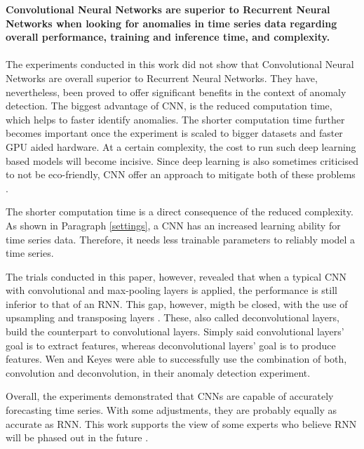 \textbf{Convolutional Neural Networks are superior to Recurrent Neural Networks when looking for anomalies in time series data regarding overall performance, training and inference time, and complexity.}\\
\\
The experiments conducted in this work did not show that Convolutional Neural Networks are overall superior to Recurrent Neural Networks. They have, nevertheless, been proved to offer significant benefits in the context of anomaly detection. The biggest advantage of CNN, is the reduced computation time, which helps to faster identify anomalies. The shorter computation time further becomes important once the experiment is scaled to bigger datasets and faster GPU aided hardware. At a certain complexity, the cost to run such deep learning based models will become incisive. Since deep learning is also sometimes criticised to not be eco-friendly, CNN offer an approach to mitigate both of these problems \parencite{Walleser2021}.

The shorter computation time is a direct consequence of the reduced complexity. As shown in Paragraph \ref{settings}, a CNN has an increased learning ability for time series data. Therefore, it needs less trainable parameters to reliably model a time series.

The trials conducted in this paper, however, revealed that when a typical CNN with convolutional and max-pooling layers is applied, the performance is still inferior to that of an RNN. This gap, however, migth be closed, with the use of upsampling and transposing layers \parencite{Wen2019}. These, also called deconvolutional layers, build the counterpart to convolutional layers. Simply said convolutional layers' goal is to extract features, whereas deconvolutional layers' goal is to produce features. Wen and Keyes \parencite*{Wen2019} were able to successfully use the combination of both, convolution and deconvolution, in their anomaly detection experiment.

Overall, the experiments demonstrated that CNNs are capable of accurately forecasting time series. With some adjustments, they are probably equally as accurate as RNN. This work supports the view of some experts who believe RNN will be phased out in the future \parencite{Culurciello2018} \parencite{Bai2018}. 

\clearpage
